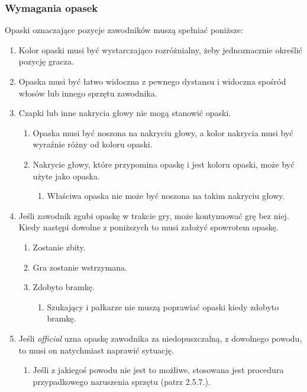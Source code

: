 \documentclass[11pt,a4paper]{article}
\begin{document}
\subsubsection{Wymagania opasek}
Opaski oznaczające pozycje zawodników muszą spełniać poniższe:
\begin{enumerate}
  \item Kolor opaski musi być wystarczająco rozróżnialny, żeby jednoznacznie określić pozycję gracza.
  \item Opaska musi być łatwo widoczna z pewnego dystansu i widoczna spośród włosów lub innego sprzętu zawodnika.
  \item Czapki lub inne nakrycia głowy nie mogą stanowić opaski.
  \begin{enumerate}
    \item Opaska musi być noszona na nakryciu głowy, a kolor nakrycia musi być wyraźnie różny od koloru opaski.
    \item Nakrycie głowy, które przypomina opaskę i jest koloru opaski, może być użyte jako opaska.
    \begin{enumerate}
      \item Właściwa opaska nie może być noszona na takim nakryciu głowy.
    \end{enumerate}
  \end{enumerate}
  \item Jeśli zawodnik zgubi opaskę w trakcie gry, może kontynuować grę bez niej. Kiedy następi dowolne z poniższych to musi założyć spowrotem opaskę.
  \begin{enumerate}
    \item Zostanie zbity.
    \item Gra zostanie wstrzymana.
    \item Zdobyto bramkę.
    \begin{enumerate}
      \item Szukający i pałkarze nie muszą poprawiać opaski kiedy zdobyto bramkę.
    \end{enumerate}
  \end{enumerate}
  \item Jeśli \emph{official} uzna opaskę zawodnika za niedopuszczalną, z dowolnego powodu, to musi on natychmiast naprawić sytuację.
  \begin{enumerate}
    \item Jeśli z jakiegoś powodu nie jest to możliwe, stosowana jest procedura przypadkowego naruszenia sprzętu (patrz 2.5.7.). %
  \end{enumerate}
\end{enumerate}
\end{document}
